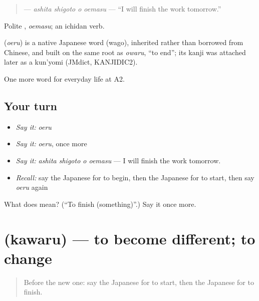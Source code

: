 \begin{quote}
\textbf{  } — \emph{ashita shigoto o oemasu} — \textquotedblleft{}I will finish the work tomorrow.\textquotedblright{}
\end{quote}

Polite \textbf{}, \emph{oemasu}; an ichidan verb.

\begin{cousinweb}
\textbf{} (\emph{oeru}) is a native Japanese word (wago), inherited rather than borrowed from Chinese, and built on the same root as \emph{owaru}, \textquotedblleft{}to end\textquotedblright{}; its kanji was attached later as a kun'yomi (JMdict, KANJIDIC2).
\end{cousinweb}

\begin{grammarlens}[title={What you've built}]
One more word for everyday life at A2.
\end{grammarlens}

\subsection*{Your turn}
\begin{itemize}
\raggedright
  \item \emph{Say it:} \emph{oeru}
  \item \emph{Say it:} \emph{oeru}, once more
  \item \emph{Say it:} \emph{ashita shigoto o oemasu} — I will finish the work tomorrow.
  \item \emph{Recall:} say the Japanese for to begin, then the Japanese for to start, then say \emph{oeru} again
\end{itemize}

\begin{tcolorbox}[breakable,colback=teal!4,colframe=teal!35!black,title={Before you move on}]
What does  mean? (\textquotedblleft{}To finish (something)\textquotedblright{}.) Say it once more.
\end{tcolorbox}
\section[\texorpdfstring{\ja{かわる} (kawaru)}{かわる (kawaru)}]{ (kawaru) — to become different; to change}

\label{lesson:JA-C167-kawaru}



\begin{quote}
Before the new one: say the Japanese for to start, then the Japanese for to finish.
\end{quote}

